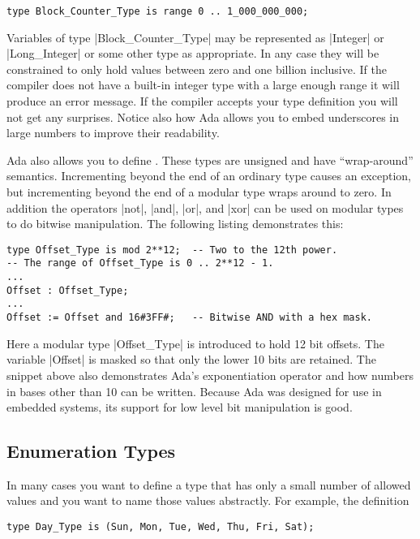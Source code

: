 \begin{lstlisting}
type Block_Counter_Type is range 0 .. 1_000_000_000;
\end{lstlisting}

Variables of type |Block_Counter_Type| may be represented as |Integer| or |Long_Integer| or some
other type as appropriate. In any case they will be constrained to only hold values between zero
and one billion inclusive. If the compiler does not have a built-in integer type with a large
enough range it will produce an error message. If the compiler accepts your type definition you
will not get any surprises. Notice also how Ada allows you to embed underscores in large numbers
to improve their readability.

Ada also allows you to define . These types are unsigned and have
``wrap-around'' semantics. Incrementing beyond the end of an ordinary type causes an exception,
but incrementing beyond the end of a modular type wraps around to zero. In addition the
operators |not|, |and|, |or|, and |xor| can be used on modular types to do bitwise manipulation.
The following listing demonstrates this:

\begin{lstlisting}
type Offset_Type is mod 2**12;  -- Two to the 12th power.
-- The range of Offset_Type is 0 .. 2**12 - 1.
...
Offset : Offset_Type;
...
Offset := Offset and 16#3FF#;   -- Bitwise AND with a hex mask.
\end{lstlisting}

\noindent Here a modular type |Offset_Type| is introduced to hold 12 bit offsets. The variable
|Offset| is masked so that only the lower 10 bits are retained. The snippet above also
demonstrates Ada's exponentiation operator and how numbers in bases other than 10 can be
written. Because Ada was designed for use in embedded systems, its support for low level bit
manipulation is good.

\subsection{Enumeration Types}

In many cases you want to define a type that has only a small number of allowed values and you
want to name those values abstractly. For example, the definition

\begin{lstlisting}
type Day_Type is (Sun, Mon, Tue, Wed, Thu, Fri, Sat);
\end{lstlisting}

